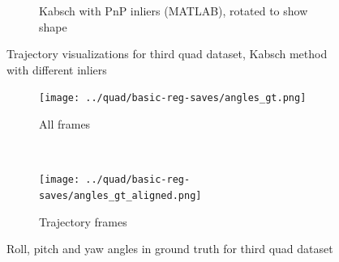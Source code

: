 \documentclass[12pt,a4paper]{article}
\begin{document}
\begin{figure}[h]
\begin{subfigure}[t]{0.5\textwidth}
  \caption{Kabsch with PnP inliers (MATLAB), rotated to show shape}
  \end{subfigure}
  \caption{Trajectory visualizations for third quad dataset, Kabsch method with different inliers}
  \label{f: quad3 kabsch}
\end{figure}

\begin{figure}[h]
  \begin{subfigure}[t]{0.5\textwidth}
  \centering
    \texttt{[image: ../quad/basic-reg-saves/angles\_gt.png]}
    \caption{All frames}
  \end{subfigure} %
  ~
  \begin{subfigure}[t]{0.5\textwidth}
    \texttt{[image: ../quad/basic-reg-saves/angles\_gt\_aligned.png]}
    \caption{Trajectory frames}
  \end{subfigure}
  \caption{Roll, pitch and yaw angles in ground truth for third quad dataset}
  \label{f: quad3 angles}
\end{figure}





\end{document}
